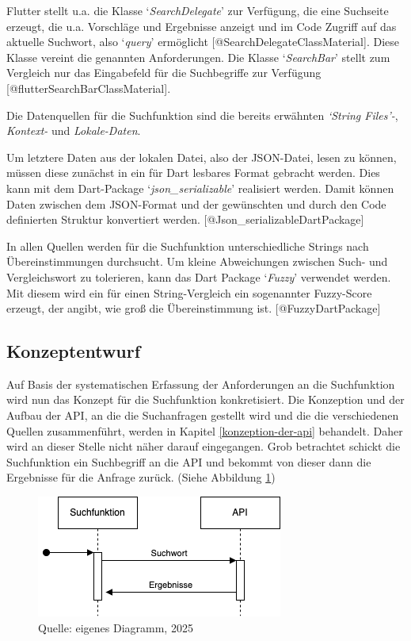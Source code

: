 \documentclass[
  12pt,
  a4paperpaper,
]{report}
\begin{document}
Flutter stellt u.a. die Klasse `\emph{SearchDelegate}' zur Verfügung,
die eine Suchseite erzeugt, die u.a. Vorschläge und Ergebnisse anzeigt
und im Code Zugriff auf das aktuelle Suchwort, also `\emph{query}'
ermöglicht {[}@SearchDelegateClassMaterial{]}. Diese Klasse vereint die
genannten Anforderungen. Die Klasse `\emph{SearchBar}' stellt zum
Vergleich nur das Eingabefeld für die Suchbegriffe zur Verfügung
{[}@flutterSearchBarClassMaterial{]}.

Die Datenquellen für die Suchfunktion sind die bereits erwähnten
\emph{`String Files'-}, \emph{Kontext-} und \emph{Lokale-Daten}.

Um letztere Daten aus der lokalen Datei, also der JSON-Datei, lesen zu
können, müssen diese zunächst in ein für Dart lesbares Format gebracht
werden. Dies kann mit dem Dart-Package `\emph{json\_serializable}'
realisiert werden. Damit können Daten zwischen dem JSON-Format und der
gewünschten und durch den Code definierten Struktur konvertiert werden.
{[}@Json\_serializableDartPackage{]}

In allen Quellen werden für die Suchfunktion unterschiedliche Strings
nach Übereinstimmungen durchsucht. Um kleine Abweichungen zwischen Such-
und Vergleichswort zu tolerieren, kann das Dart Package `\emph{Fuzzy}'
verwendet werden. Mit diesem wird ein für einen String-Vergleich ein
sogenannter Fuzzy-Score erzeugt, der angibt, wie groß die
Übereinstimmung ist. {[}@FuzzyDartPackage{]}

\subsection{Konzeptentwurf}\label{konzeptentwurf}

Auf Basis der systematischen Erfassung der Anforderungen an die
Suchfunktion wird nun das Konzept für die Suchfunktion konkretisiert.
Die Konzeption und der Aufbau der API, an die die Suchanfragen gestellt
wird und die die verschiedenen Quellen zusammenführt, werden in Kapitel
\ref{konzeption-der-api} behandelt. Daher wird an dieser Stelle nicht
näher darauf eingegangen. Grob betrachtet schickt die Suchfunktion ein
Suchbegriff an die API und bekommt von dieser dann die Ergebnisse für
die Anfrage zurück. (Siehe Abbildung \ref{fig:suchfunktion_api})

\begin{figure}
\centering
\includegraphics[width=0.5\linewidth,height=\textheight,keepaspectratio]{source/figures/Suchfunktion_API.drawio.png}
\caption{Quelle: eigenes Diagramm, 2025}\label{fig:suchfunktion_api}
\end{figure}
\end{document}

